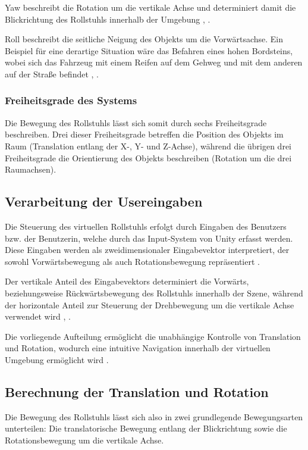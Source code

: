 Yaw beschreibt die Rotation um die vertikale Achse und determiniert damit die Blickrichtung des Rollstuhls innerhalb der Umgebung \cite{Diebel2006}, \cite{Huck}.

Roll beschreibt die seitliche Neigung des Objekts um die Vorwärtsachse. Ein Beispiel für eine derartige Situation wäre das Befahren eines hohen Bordsteins, wobei sich das Fahrzeug mit einem Reifen auf dem Gehweg und mit dem anderen auf der Straße befindet \cite{Diebel2006}, \cite{Huck}.

\subsubsection{Freiheitsgrade des Systems}
Die Bewegung des Rollstuhls lässt sich somit durch sechs Freiheitsgrade beschreiben. Drei dieser Freiheitsgrade betreffen die Position des Objekts im Raum (Translation entlang der X-, Y- und Z-Achse), während die übrigen drei Freiheitsgrade die Orientierung des Objekts beschreiben (Rotation um die drei Raumachsen).

\subsection{Verarbeitung der Usereingaben}
Die Steuerung des virtuellen Rollstuhls erfolgt durch Eingaben des Benutzers bzw. der Benutzerin, welche durch das Input-System von Unity erfasst werden. Diese Eingaben werden als zweidimensionaler Eingabevektor interpretiert, der sowohl Vorwärtsbewegung als auch Rotationsbewegung repräsentiert \cite{Unity11}.

Der vertikale Anteil des Eingabevektors determiniert die Vorwärts, beziehungsweise Rückwärtsbewegung des Rollstuhls innerhalb der Szene, während der horizontale Anteil zur Steuerung der Drehbewegung um die vertikale Achse verwendet wird \cite{Bowman2004}, \cite{Diebel2006}.

Die vorliegende Aufteilung ermöglicht die unabhängige Kontrolle von Translation und Rotation, wodurch eine intuitive Navigation innerhalb der virtuellen Umgebung ermöglicht wird \cite{Bowman2004}.

\subsection{Berechnung der Translation und Rotation}
Die Bewegung des Rollstuhls lässt sich also in zwei grundlegende Bewegungsarten unterteilen: Die translatorische Bewegung entlang der Blickrichtung sowie die Rotationsbewegung um die vertikale Achse.

